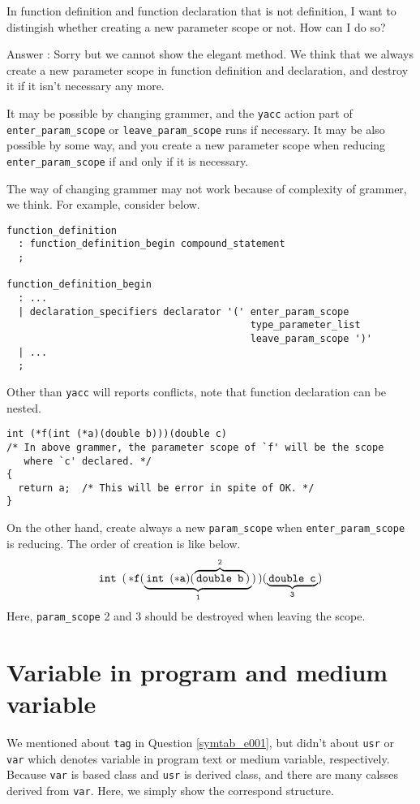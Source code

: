 \begin{QandA}
In function definition and function declaration that is not definition,
I want to distingish whether creating a new parameter scope or not.
How can I do so?

Answer : Sorry but we cannot show the elegant method.
We think that we always create a new parameter scope in
function definition and declaration, and destroy it
if it isn't necessary any more.

It may be possible by changing grammer, and the {\tt{yacc}} action part
of {\tt{enter\_param\_scope}} or {\tt{leave\_param\_scope}} 
runs if necessary.
It may be also possible by some way, and you create a new parameter
scope when reducing {\tt{enter\_param\_scope}} if and only if it is
necessary.

The way of changing grammer may not work because of complexity of
grammer, we think. For example, consider below.

\begin{verbatim}
function_definition
  : function_definition_begin compound_statement
  ;

function_definition_begin
  : ...
  | declaration_specifiers declarator '(' enter_param_scope
                                          type_parameter_list
                                          leave_param_scope ')'
  | ...
  ;
\end{verbatim}
Other than {\tt{yacc}} will reports conflicts,
note that function declaration can be nested.
\begin{verbatim}
int (*f(int (*a)(double b)))(double c)
/* In above grammer, the parameter scope of `f' will be the scope
   where `c' declared. */
{
  return a;  /* This will be error in spite of OK. */
}
\end{verbatim}

On the other hand, create always a new {\tt{param\_scope}}
when {\tt{enter\_param\_scope}} is reducing. The order of
creation is like below.
\[
{\tt{int\,\,\,(\,*f(
\underbrace{{\tt{\,int\,\,\,(*a)(
\overbrace{\tt{\,double\,\,\,b\,}}^{2})\,}}}_{1})\,)
(\underbrace{\tt{\,double\,\,\,c}\,}_{3})}}
\]
Here,  {\tt{param\_scope}} 2 and 3 should be destroyed
when leaving the scope.
\end{QandA}

\section{Variable in program and medium variable}
\label{symtab_e003}
We mentioned about {\tt{tag}} in Question \ref{symtab_e001}, but
didn't about {\tt{usr}} or {\tt{var}} which denotes
variable in program text or medium variable, respectively.
Because {\tt{var}} is based class and {\tt{usr}} is derived class,
and there are many calsses derived from {\tt{var}}.
Here, we simply show the correspond structure.

